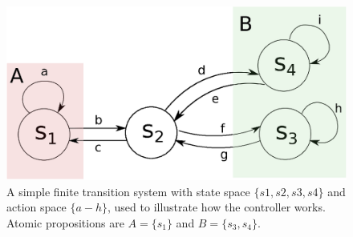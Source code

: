 

\begin{figure}
	\centering
	\includegraphics[width=0.7\linewidth]{pic/eg1}
	\caption{A simple finite transition system with state space $\{s1,s2,s3,s4\}$ and action space $\{a-h\}$, used to illustrate how the controller works. Atomic propositions are $ A =\{s_1\} $ and $ B=\{s_3, s_4\} $.}
	\label{fig:eg1}
\end{figure}

